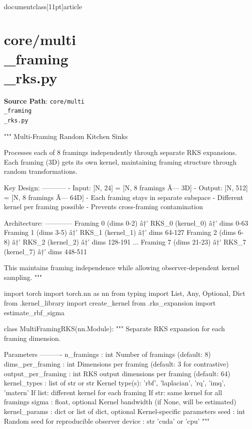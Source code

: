 \\documentclass[11pt]{article}
\begin{document}
\section*{core/multi\\_framing\\_rks.py}
\textbf{Source Path}: \texttt{core/multi\\_framing\\_rks.py}\par
\bigskip
\begin{CodeBlock}
"""
Multi-Framing Random Kitchen Sinks

Processes each of 8 framings independently through separate RKS expansions.
Each framing (3D) gets its own kernel, maintaining framing structure through
random transformations.

Key Design:
-----------
- Input: [N, 24] = [N, 8 framings Ã— 3D]
- Output: [N, 512] = [N, 8 framings Ã— 64D]
- Each framing stays in separate subspace
- Different kernel per framing possible
- Prevents cross-framing contamination

Architecture:
------------
Framing 0 (dims 0-2)   â†’ RKS_0 (kernel_0) â†’ dims 0-63
Framing 1 (dims 3-5)   â†’ RKS_1 (kernel_1) â†’ dims 64-127
Framing 2 (dims 6-8)   â†’ RKS_2 (kernel_2) â†’ dims 128-191
...
Framing 7 (dims 21-23) â†’ RKS_7 (kernel_7) â†’ dims 448-511

This maintains framing independence while allowing observer-dependent
kernel sampling.
"""

import torch
import torch.nn as nn
from typing import List, Any, Optional, Dict
from .kernel_library import create_kernel
from .rks_expansion import estimate_rbf_sigma


class MultiFramingRKS(nn.Module):
    """
    Separate RKS expansion for each framing dimension.
    
    Parameters
    ----------
    n_framings : int
        Number of framings (default: 8)
    dims_per_framing : int
        Dimensions per framing (default: 3 for contrastive)
    output_per_framing : int
        RKS output dimensions per framing (default: 64)
    kernel_types : list of str or str
        Kernel type(s): 'rbf', 'laplacian', 'rq', 'imq', 'matern'
        If list: different kernel for each framing
        If str: same kernel for all framings
    sigma : float, optional
        Kernel bandwidth (if None, will be estimated)
    kernel_params : dict or list of dict, optional
        Kernel-specific parameters
    seed : int
        Random seed for reproducible observer
    device : str
        'cuda' or 'cpu'
    """
    

\end{CodeBlock}
\end{document}
